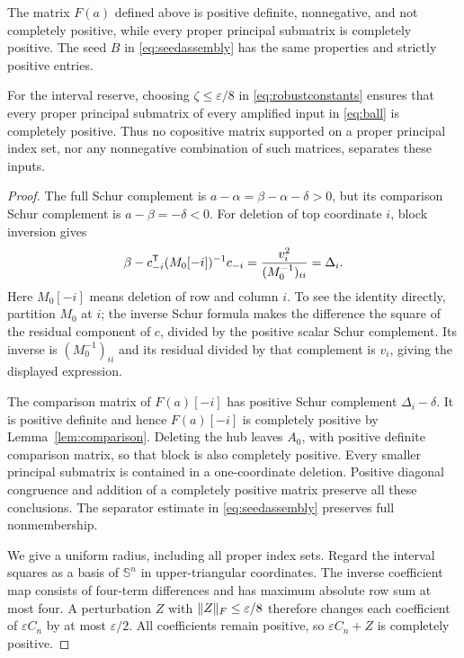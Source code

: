 \begin{theorem}\label{thm:minimal}
The matrix $F(a)$ defined above is positive definite, nonnegative, and not completely positive, while every proper principal submatrix is completely positive. The seed $B$ in \eqref{eq:seedassembly} has the same properties and strictly positive entries.

For the interval reserve, choosing $\zeta\le\varepsilon/8$ in \eqref{eq:robustconstants} ensures that every proper principal submatrix of every amplified input in \eqref{eq:ball} is completely positive. Thus no copositive matrix supported on a proper principal index set, nor any nonnegative combination of such matrices, separates these inputs.
\end{theorem}
\begin{proof}
The full Schur complement is $a-\alpha=\beta-\alpha-\delta>0$, but its comparison Schur complement is $a-\beta=-\delta<0$. For deletion of top coordinate $i$, block inversion gives
\begin{equation}\label{eq:deletionidentity}
 \beta-c_{-i}^{\mathsf T}(M_0[-i])^{-1}c_{-i}
 =\frac{v_i^2}{(M_0^{-1})_{ii}}=\Delta_i.
\end{equation}
Here $M_0[-i]$ means deletion of row and column $i$. To see the identity directly, partition $M_0$ at $i$; the inverse Schur formula makes the difference the square of the residual component of $c$, divided by the positive scalar Schur complement. Its inverse is $(M_0^{-1})_{ii}$ and its residual divided by that complement is $v_i$, giving the displayed expression.

The comparison matrix of $F(a)[-i]$ has positive Schur complement $\Delta_i-\delta$. It is positive definite and hence $F(a)[-i]$ is completely positive by Lemma~\ref{lem:comparison}. Deleting the hub leaves $A_0$, with positive definite comparison matrix, so that block is also completely positive. Every smaller principal submatrix is contained in a one-coordinate deletion. Positive diagonal congruence and addition of a completely positive matrix preserve all these conclusions. The separator estimate in \eqref{eq:seedassembly} preserves full nonmembership.

We give a uniform radius, including all proper index sets. Regard the interval squares as a basis of $\mathbb S^n$ in upper-triangular coordinates. The inverse coefficient map consists of four-term differences and has maximum absolute row sum at most four. A perturbation $Z$ with $\lVert Z\rVert_F\le\varepsilon/8$ therefore changes each coefficient of $\varepsilon C_n$ by at most $\varepsilon/2$. All coefficients remain positive, so $\varepsilon C_n+Z$ is completely positive.


\end{proof}
